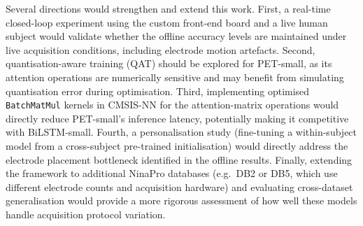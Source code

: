 \documentclass[11pt]{article}
\begin{document}
Several directions would strengthen and extend this work. First, a real-time closed-loop experiment using the custom front-end board and a live human subject would validate whether the offline accuracy levels are maintained under live acquisition conditions, including electrode motion artefacts. Second, quantisation-aware training (QAT) should be explored for PET-small, as its attention operations are numerically sensitive and may benefit from simulating quantisation error during optimisation. Third, implementing optimised \texttt{BatchMatMul} kernels in CMSIS-NN for the attention-matrix operations would directly reduce PET-small's inference latency, potentially making it competitive with BiLSTM-small. Fourth, a personalisation study (fine-tuning a within-subject model from a cross-subject pre-trained initialisation) would directly address the electrode placement bottleneck identified in the offline results. Finally, extending the framework to additional NinaPro databases (e.g.\ DB2 or DB5, which use different electrode counts and acquisition hardware) and evaluating cross-dataset generalisation would provide a more rigorous assessment of how well these models handle acquisition protocol variation.




\clearpage
{}
\setcounter{page}{1}
\end{document}

